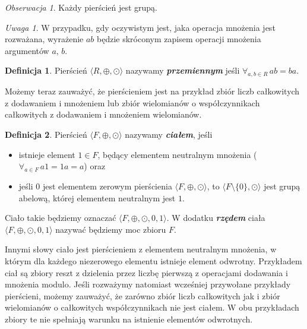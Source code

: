 \documentclass[declaration,shortabstract]{iithesis}
\theoremstyle{definition}
\newtheorem{definition}{Definicja}
\theoremstyle{remark} \newtheorem{observation}{Obserwacja}
\theoremstyle{plain} \newtheorem{theorem}{Twierdzenie}
\theoremstyle{plain} \newtheorem{lemma}{Lemat}
\theoremstyle{remark} \newtheorem*{remark*}{Uwaga}
\theoremstyle{reminder} \newtheorem*{reminder*}{Przypomnienie}
\begin{document}
\theoremstyle{observation}
\begin{observation}
	Każdy pierścień jest grupą.
\end{observation}

\begin{remark*}
	W przypadku, gdy oczywistym jest, jaka operacja mnożenia jest rozważana, wyrażenie $ab$ będzie skróconym zapisem operacji mnożenia argumentów $a, \,b$.
\end{remark*}

\theoremstyle{definition}
\begin{definition}
	Pierścień $\langle R, \oplus, \odot \rangle$ nazywamy \textit{\textbf{przemiennym}} jeśli $\forall_{a, b \in R} \, ab = ba$.
\end{definition}

Możemy teraz zauważyć, że pierścieniem jest na przykład zbiór liczb całkowitych z dodawaniem i mnożeniem lub zbiór wielomianów o współczynnikach całkowitych z dodawaniem i mnożeniem wielomianów.

\theoremstyle{definition} 
\begin{definition} \label{cialo}
	Pierścień $\langle F, \oplus, \odot \rangle$ nazywamy \textit{\textbf{ciałem}}, jeśli 
	\begin{itemize}[leftmargin=.4in]
		\item istnieje element $1 \in F$, będący elementem neutralnym mnożenia ($\forall_{a \in F} \, a1 = 1a = a$) oraz
		\item jeśli $0$ jest elementem zerowym pierścienia $\langle F, \oplus, \odot \rangle$, to $\langle F \setminus \{0\}, \odot \rangle$ jest grupą abelową, której elementem neutralnym jest $1$.
	\end{itemize}
	Ciało takie będziemy oznaczać $\langle F, \oplus, \odot, 0, 1 \rangle$. W dodatku \textbf{\textit{rzędem}} ciała $\langle F, \oplus, \odot, 0, 1 \rangle$ nazywać będziemy moc zbioru $F$.
\end{definition}

Innymi słowy ciało jest pierścieniem z elementem neutralnym mnożenia, w którym dla każdego niezerowego elementu istnieje element odwrotny. Przykładem ciał są zbiory reszt z dzielenia przez liczbę pierwszą z operacjami dodawania i mnożenia modulo. Jeśli rozważymy natomiast wcześniej przywołane przykłady pierścieni, możemy zauważyć, że zarówno zbiór liczb całkowitych jak i zbiór wielomianów o całkowitych współczynnikach nie jest ciałem. W obu przykładach zbiory te nie spełniają warunku na istnienie elementów odwrotnych.
\end{document}

